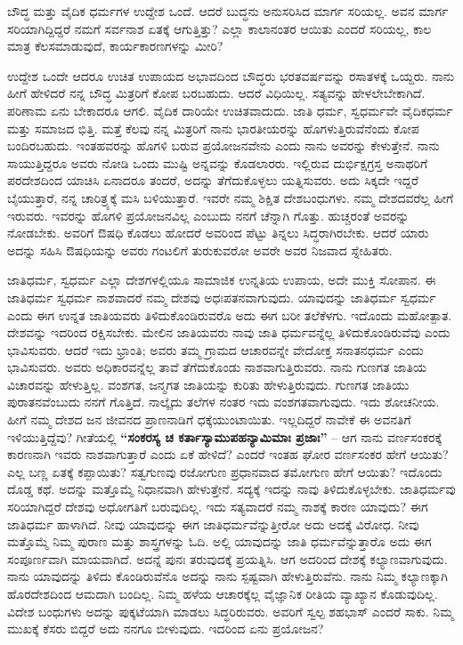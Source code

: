 ಬೌದ್ಧ ಮತ್ತು ವೈದಿಕ ಧರ್ಮಗಳ ಉದ್ದೇಶ ಒಂದೆ. ಆದರೆ ಬುದ್ಧನು ಅನುಸರಿಸಿದ ಮಾರ್ಗ ಸರಿಯಲ್ಲ. ಅವನ ಮಾರ್ಗ ಸರಿಯಾಗಿದ್ದಿದ್ದರೆ ನಮಗೆ ಸರ್ವನಾಶ ಏತಕ್ಕೆ ಆಗುತ್ತಿತ್ತು? ಎಲ್ಲಾ ಕಾಲಾನಂತರ ಆಯಿತು ಎಂದರೆ ಸರಿಯಲ್ಲ, ಕಾಲ ಮಾತ್ರ ಕೆಲಸಮಾಡು\break ವುದೆ, ಕಾರ್ಯಕಾರಣಗಳನ್ನು ಮೀರಿ?

ಉದ್ದೇಶ ಒಂದೇ ಆದರೂ ಉಚಿತ ಉಪಾಯದ ಅಭಾವದಿಂದ ಬೌದ್ಧರು ಭರತವರ್ಷ\break ವನ್ನು ರಸಾತಳಕ್ಕೆ ಒಯ್ದರು. ನಾನು ಹೀಗೆ ಹೇಳಿದರೆ ನನ್ನ ಬೌದ್ಧ ಮಿತ್ರರಿಗೆ ಕೋಪ ಬರಬಹುದು. ಆದರೆ ವಿಧಿಯಿಲ್ಲ. ಸತ್ಯವನ್ನು ಹೇಳಲೇಬೇಕಾಗಿದೆ. ಪರಿಣಾಮ ಏನು ಬೇಕಾದರೂ ಆಗಲಿ. ವೈದಿಕ ದಾರಿಯೇ ಉಚಿತವಾದುದು. ಜಾತಿ ಧರ್ಮ, ಸ್ವಧರ್ಮವೇ ವೈದಿಕಧರ್ಮ ಮತ್ತು ಸಮಾಜದ ಭಿತ್ತಿ. ಮತ್ತೆ ಕೆಲವು ನನ್ನ ಮಿತ್ರರಿಗೆ ನಾನು ಭಾರತೀಯರನ್ನು ಹೊಗಳುತ್ತಿರುವೆನೆಂದು ಕೋಪ ಬಂದಿರಬಹುದು. ಇಂತಹವರನ್ನು ಹೊಗಳಿ ಬರುವ ಪ್ರಯೋಜನವೇನು ಎಂದು ನಾನು ಅವರನ್ನು ಕೇಳುತ್ತೇನೆ. ನಾನು ಸಾಯುತ್ತಿದ್ದರೂ ಅವರು ನೋಡಿ ಒಂದು ಮುಷ್ಟಿ ಅನ್ನವನ್ನು ಕೊಡಲಾರರು. ಇಲ್ಲಿರುವ ದುರ್ಭಿಕ್ಷಗ್ರಸ್ತ ಅನಾಥರಿಗೆ ಪರದೇಶದಿಂದ ಯಾಚಿಸಿ ಏನಾದರೂ ತಂದರೆ, ಅದನ್ನು ತೆಗೆದುಕೊಳ್ಳಲು ಯತ್ನಿಸುವರು. ಅದು ಸಿಕ್ಕದೇ ಇದ್ದರೆ ಬೈಯುತ್ತಾರೆ, ನನ್ನ ಚಾರಿತ್ರ್ಯಕ್ಕೆ ಮಸಿ ಬಳಿಯುತ್ತಾರೆ. ಇವರೇ ನಮ್ಮ ಶಿಕ್ಷಿತ ದೇಶಬಂಧುಗಳು. ನಮ್ಮ ದೇಶದವರೆಲ್ಲ ಹೀಗೆ ಇರುವರು. ಇವರನ್ನು ಹೊಗಳಿ ಪ್ರಯೋಜನವಿಲ್ಲ ಎಂಬುದು ನನಗೆ ಚೆನ್ನಾಗಿ ಗೊತ್ತು. ಹುಚ್ಚರಂತೆ ಅವರನ್ನು ನೋಡಬೇಕು. ಅವರಿಗೆ ಔಷಧಿ ಕೊಡಲು ಹೋದರೆ ಅವರಿಂದ ಪೆಟ್ಟು ತಿನ್ನಲು ಸಿದ್ಧರಾಗಿರಬೇಕು. ಆದರೆ ಯಾರು ಅದನ್ನು ಸಹಿಸಿ ಔಷಧಿಯನ್ನು ಅವರು ಗಂಟಲಿಗೆ ತುರುಕುವರೋ ಅವರೇ ಅವರ ನಿಜವಾದ ಸ್ನೇಹಿತರು.

\vskip 6pt

ಜಾತಿಧರ್ಮ, ಸ್ವಧರ್ಮ ಎಲ್ಲಾ ದೇಶಗಳಲ್ಲಿಯೂ ಸಾಮಾಜಿಕ ಉನ್ನತಿಯ ಉಪಾಯ, ಅದೇ ಮುಕ್ತಿ ಸೋಪಾನ. ಈ ಜಾತಿಧರ್ಮ ಸ್ವಧರ್ಮ ನಾಶವಾದರೆ ನಮ್ಮ ದೇಶವು ಅಧಃಪತನವಾಗುವುದು. ಯಾವುದನ್ನು ಜಾತಿಧರ್ಮ ಸ್ವಧರ್ಮ ಎಂದು ಈಗ ಉನ್ನತ ಜಾತಿಯವರು ತಿಳಿದುಕೊಂಡಿರುವರೊ ಅದು ಈಗ ಬರೀ ತಲೆಕೆಳಗು. ಇದೊಂದು ಮಹೋತ್ಪಾತ. ದೇಶವನ್ನು ಇದರಿಂದ ರಕ್ಷಿಸಬೇಕು. ಮೇಲಿನ ಜಾತಿಯವರು ನಾವು ಜಾತಿ ಧರ್ಮವನ್ನೆಲ್ಲ ತಿಳಿದುಕೊಂಡಿರುವೆವು ಎಂದು ಭಾವಿಸುವರು. ಆದರೆ ಇದು ಭ್ರಾಂತಿ; ಅವರು ತಮ್ಮ ಗ್ರಾಮದ ಆಚಾರವನ್ನೇ ವೇದೋಕ್ತ ಸನಾತನಧರ್ಮ ಎಂದು ಭಾವಿಸುವರು. ಅವರು ಅಧಿಕಾರವನ್ನೆಲ್ಲ ತಾವೆ ತೆಗೆದುಕೊಂಡು ನಾಶವಾಗುತ್ತಿರುವರು. ನಾನು ಗುಣಗತ ಜಾತಿಯ ವಿಚಾರವನ್ನು ಹೇಳುತ್ತಿಲ್ಲ. ವಂಶಗತ, ಜನ್ಮಗತ ಜಾತಿಯನ್ನು ಕುರಿತು ಹೇಳುತ್ತಿರುವುದು. ಗುಣಗತ ಜಾತಿಯು ಪುರಾತನವೆಂಬುದು ನನಗೆ ಗೊತ್ತಿದೆ. ನಾಲ್ಕೈದು ತಲೆಗಳ ನಂತರ ಇದು ವಂಶಗತವಾಗುವುದು. ಇದು ಶೋಚನೀಯ. ಹೀಗೆ ನಮ್ಮ ದೇಶದ ಜನ ಜೀವನದ ಪ್ರಾಣನಾಡಿಗೆ ಧಕ್ಕೆಯುಂಟಾಯಿತು. ಇಲ್ಲದಿದ್ದರೆ ನಾವೇಕೆ ಈ ಅವನತಿಗೆ ಇಳಿಯುತ್ತಿದ್ದೆವು? ಗೀತೆಯಲ್ಲಿ \textbf{“ಸಂಕರಸ್ಯ ಚ ಕರ್ತಾಸ್ಯಾಮುಪಹನ್ಯಾಮಿಮಾಃ ಪ್ರಜಾಃ”} – ಆಗ ನಾನು ವರ್ಣಸಂಕರಕ್ಕೆ ಕಾರಣನಾಗಿ ಇವರು ನಾಶವಾಗುತ್ತಾರೆ ಎಂದು ಏಕೆ ಹೇಳಿದೆ? ಎಂದರೆ ಇಂತಹ ಘೋರ ವರ್ಣಸಂಕರ ಹೇಗೆ ಆಯಿತು? ಎಲ್ಲ ಬಣ್ಣ ಏತಕ್ಕೆ ಕಪ್ಪಾಯಿತು? ಸತ್ವಗುಣವು ರಜೋಗುಣ ಪ್ರಧಾನವಾದ ತಮೋಗುಣ ಹೇಗೆ ಆಯಿತು? ಇದೊಂದು ದೊಡ್ಡ ಕಥೆ. ಅದನ್ನು ಮತ್ತೊಮ್ಮೆ ನಿಧಾನವಾಗಿ ಹೇಳುತ್ತೇನೆ. ಸದ್ಯಕ್ಕೆ ಇದನ್ನು ನಾವು ತಿಳಿದುಕೊಳ್ಳಬೇಕು. ಜಾತಿಧರ್ಮವು ಸರಿಯಾಗಿದ್ದರೆ ದೇಶವು ಅಧೋಗತಿಗೆ ಬರುವುದಿಲ್ಲ. ಇದು ಸತ್ಯವಾದರೆ ನಮ್ಮ ನಾಶಕ್ಕೆ ಕಾರಣ ಯಾವುದು? ಈಗ ಜಾತಿಧರ್ಮ ಹಾಳಾಗಿದೆ. ನೀವು ಯಾವುದನ್ನು ಈಗ ಜಾತಿಧರ್ಮವೆನ್ನುತ್ತೀರೋ ಅದು ಅದಕ್ಕೆ ವಿರೋಧ. ನೀವು ಮತ್ತೊಮ್ಮೆ ನಿಮ್ಮ ಪುರಾಣ ಮತ್ತು ಶಾಸ್ತ್ರಗಳನ್ನು ಓದಿ. ಅಲ್ಲಿ ಯಾವುದನ್ನು ಜಾತಿ ಧರ್ಮವೆನ್ನುತ್ತಾರೊ ಅದು ಈಗ ಸಂಪೂರ್ಣವಾಗಿ ಮಾಯವಾಗಿದೆ. ಅದನ್ನೆ ಪುನಃ ತರುವುದಕ್ಕೆ ಪ್ರಯತ್ನಿಸಿ. ಆಗ ಅದರಿಂದ ದೇಶಕ್ಕೆ ಕಲ್ಯಾಣವಾಗುವುದು. ನಾನು ಯಾವುದನ್ನು ತಿಳಿದು ಕೊಂಡಿರುವೆನೊ ಅದನ್ನು ನಾನು ಸ್ಪಷ್ಟವಾಗಿ ಹೇಳುತ್ತಿರುವೆನು. ನಾನು ನಿಮ್ಮ ಕಲ್ಯಾಣಕ್ಕಾಗಿ ಹೊರದೇಶದಿಂದ ಆಮದಾಗಿ ಬಂದಿಲ್ಲ. ನಿಮ್ಮ ಹಳೆಯ ಆಚಾರಕ್ಕೆಲ್ಲ ವೈಜ್ಞಾನಿಕ ರೀತಿಯ ವ್ಯಾಖ್ಯಾನ ಕೊಡುವುದಿಲ್ಲ. ವಿದೇಶ ಬಂಧುಗಳು ಅದನ್ನು ಪುಕ್ಕಟೆಯಾಗಿ ಮಾಡಲು ಸಿದ್ಧರಿರುವರು. ಅವರಿಗೆ ಸ್ವಲ್ಪ ಶಹಭಾಸ್​ ಎಂದರೆ ಸಾಕು. ನಿಮ್ಮ ಮುಖಕ್ಕೆ ಕೆಸರು ಬಿದ್ದರೆ ಅದು ನನಗೂ ಬೀಳುವುದು. ಇದರಿಂದ ಏನು ಪ್ರಯೋಜನ?

